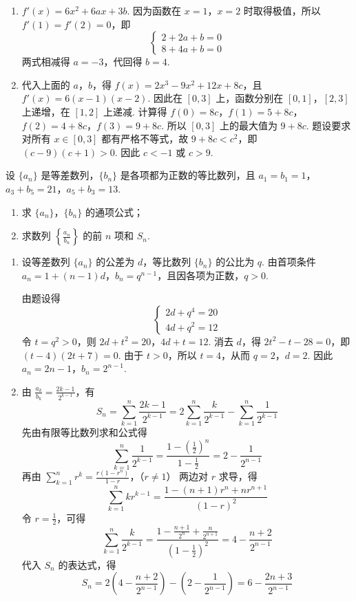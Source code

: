 \begin{solution}
\begin{enumerate}
\item \(f'(x)=6x^2+6ax+3b\). 因为函数在 \(x=1\)，\(x=2\) 时取得极值，所以
\(f'(1)=f'(2)=0\)，即
\[
\begin{cases}
2+2a+b=0\\
8+4a+b=0
\end{cases}
\]
两式相减得 \(a=-3\)，代回得 \(b=4\).
\item 代入上面的 \(a\)，\(b\)，得
\(f(x)=2x^3-9x^2+12x+8c\)，且
\(f'(x)=6(x-1)(x-2)\). 因此在 \([0,3]\) 上，函数分别在 \([0,1]\)，\([2,3]\) 上递增，在 \([1,2]\) 上递减. 计算得
\(f(0)=8c\)，\(f(1)=5+8c\)，\(f(2)=4+8c\)，\(f(3)=9+8c\).
所以 \([0,3]\) 上的最大值为 \(9+8c\). 题设要求对所有 \(x\in[0,3]\) 都有严格不等式，故
\(9+8c<c^2\)，即
\((c-9)(c+1)>0\). 因此 \(c<-1\) 或 \(c>9\).
\end{enumerate}
\end{solution}

\begin{problem}
设 \(\{a_{n}\}\) 是等差数列，\(\{b_{n}\}\) 是各项都为正数的等比数列，且 \(a_{1} = b_{1} = 1\)，\(a_{3} + b_{5} = 21\)，\(a_{5} + b_{3} = 13\).

\begin{enumerate}
\item 求 \(\{a_{n}\}\)，\(\{b_{n}\}\) 的通项公式；
\item 求数列 \(\left\{\frac{a_{n}}{b_{n}}\right\}\) 的前 \(n\) 项和 \(S_{n}\).
\end{enumerate}
\end{problem}

\begin{solution}
\begin{enumerate}
\item 设等差数列 \(\{a_n\}\) 的公差为 \(d\)，等比数列 \(\{b_n\}\) 的公比为 \(q\). 由首项条件
\(a_n=1+(n-1)d\)，\(b_n=q^{n-1}\)，且因各项为正数，\(q>0\).

由题设得
\[
\begin{cases}
2d+q^4=20\\
4d+q^2=12
\end{cases}
\]
令 \(t=q^2>0\)，则 \(2d+t^2=20\)，\(4d+t=12\). 消去 \(d\)，得
\(2t^2-t-28=0\)，即 \((t-4)(2t+7)=0\). 由于 \(t>0\)，所以 \(t=4\)，从而 \(q=2\)，\(d=2\). 因此
\(a_n=2n-1\)，\(b_n=2^{n-1}\).
\item 由 \(\frac{a_k}{b_k}=\frac{2k-1}{2^{k-1}}\)，有
\[
S_n=\sum_{k=1}^n\frac{2k-1}{2^{k-1}}=2\sum_{k=1}^n\frac{k}{2^{k-1}}-\sum_{k=1}^n\frac{1}{2^{k-1}}
\]
先由有限等比数列求和公式得
\[
\sum_{k=1}^n\frac{1}{2^{k-1}}
=\frac{1-\left(\frac{1}{2}\right)^n}{1-\frac{1}{2}}
=2-\frac{1}{2^{n-1}}
\]
再由
\(\sum_{k=1}^n r^k=\frac{r(1-r^n)}{1-r}\)，（\(r\ne1\)）
两边对 \(r\) 求导，得
\[
\sum_{k=1}^nkr^{k-1}
=\frac{1-(n+1)r^n+nr^{n+1}}{(1-r)^2}
\]
令 \(r=\frac{1}{2}\)，可得
\[
\sum_{k=1}^n\frac{k}{2^{k-1}}
=\frac{1-\frac{n+1}{2^n}+\frac{n}{2^{n+1}}}{\left(1-\frac{1}{2}\right)^2}
=4-\frac{n+2}{2^{n-1}}
\]
代入 \(S_n\) 的表达式，得
\[
S_n=2\left(4-\frac{n+2}{2^{n-1}}\right)-\left(2-\frac{1}{2^{n-1}}\right)
=6-\frac{2n+3}{2^{n-1}}
\]
\end{enumerate}
\end{solution}

